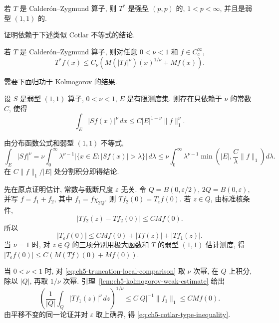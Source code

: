 \begin{Theorem}
\label{thm:ch5-maximal-cz-bounds}
若 $T$ 是 Calderón--Zygmund 算子, 则 $T^*$ 是强型 $(p,p)$ 的, $1<p<\infty$, 并且是弱型 $(1,1)$ 的.
\end{Theorem}

证明依赖于下述类似 Cotlar 不等式的结论.

\begin{Lemma}
\label{lem:ch5-cotlar-type-inequality}
若 $T$ 是 Calderón--Zygmund 算子, 则对任意 $0<\nu<1$ 和 $f\in C_c^\infty$,
\begin{equation}
\label{eq:ch5-cotlar-type-inequality}
 T^*f(x)\le C_\nu\left(M(|Tf|^\nu)(x)^{1/\nu}+Mf(x)\right).
\end{equation}
\end{Lemma}

需要下面归功于 Kolmogorov 的结果.

\begin{Lemma}
\label{lem:ch5-kolmogorov-weak-estimate}
设 $S$ 是弱型 $(1,1)$ 算子, $0<\nu<1$, $E$ 是有限测度集. 则存在只依赖于 $\nu$ 的常数 $C$, 使得
\[
 \int_E|Sf(x)|^\nu\,dx\le C|E|^{1-\nu}\|f\|_1^\nu.
\]
\end{Lemma}

\begin{Proof}
由分布函数公式和弱型 $(1,1)$ 不等式,
\[
 \int_E|Sf|^\nu
 =\nu\int_0^\infty\lambda^{\nu-1}
 |\{x\in E:|Sf(x)|>\lambda\}|\,d\lambda
 \le\nu\int_0^\infty\lambda^{\nu-1}
 \min\left(|E|,\frac C\lambda\|f\|_1\right)d\lambda.
\]
在 $C\|f\|_1/|E|$ 处分割积分即得结论.
\end{Proof}

\hypertarget{chapter-05-page-115}{}
\begin{Proof}
先在原点证明估计, 常数与截断尺度 $\varepsilon$ 无关. 令 $Q=B(0,\varepsilon/2)$, $2Q=B(0,\varepsilon)$, 并写 $f=f_1+f_2$, 其中 $f_1=f\chi_{2Q}$. 则 $Tf_2(0)=T_\varepsilon f(0)$. 若 $z\in Q$, 由标准核条件,
\[
 |Tf_2(z)-Tf_2(0)|\le CMf(0).
\]
所以
\begin{equation}
\label{eq:ch5-truncation-local-comparison}
 |T_\varepsilon f(0)|\le CMf(0)+|Tf(z)|+|Tf_1(z)|.
\end{equation}
当 $\nu=1$ 时, 对 $z\in Q$ 的三项分别用极大函数和 $T$ 的弱型 $(1,1)$ 估计测度, 得 $|T_\varepsilon f(0)|\le C(M(Tf)(0)+Mf(0))$.

当 $0<\nu<1$ 时, 对 \eqref{eq:ch5-truncation-local-comparison} 取 $\nu$ 次幂, 在 $Q$ 上积分, 除以 $|Q|$, 再取 $1/\nu$ 次幂. 引理~\ref{lem:ch5-kolmogorov-weak-estimate} 给出
\[
 \left(\frac1{|Q|}\int_Q|Tf_1(z)|^\nu\,dz\right)^{1/\nu}
 \le C|Q|^{-1}\|f_1\|_1\le CMf(0).
\]
由平移不变的同一论证并对 $\varepsilon$ 取上确界, 得 \eqref{eq:ch5-cotlar-type-inequality}.
\end{Proof}

